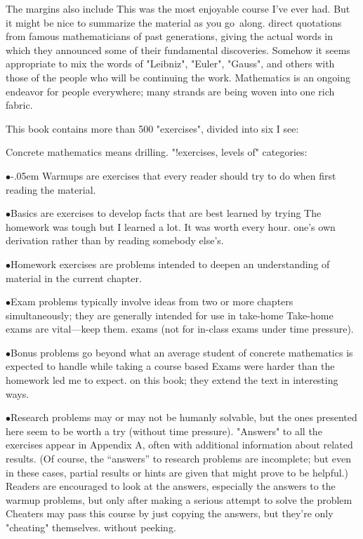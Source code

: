 The margins also include
\g This was the most enjoyable course I've ever had. But it might be nice
to summarize the material as you go~along.\g
direct quotations from famous mathematicians of past generations,
giving the actual words in which they announced some of their
fundamental discoveries. Somehow it seems appropriate to
mix the words of "Leibniz", "Euler", "Gauss", and others with those of
the people who will be continuing the work. Mathematics is an
ongoing endeavor for people everywhere; many strands are being woven
into one rich fabric.

This book contains more than 500 "exercises", divided into six
\g I see:\par Concrete mathematics means drilling.\g
"!exercises, levels of"
categories:

\def\\#1{\smallskip\item{$\bullet$}{\subsubtitle#1\enspace}\ignorespaces}
\\{\kern-.05em Warmups} are exercises that {\sc every reader} should try to
	do when first reading the material.
\\{Basics} are exercises to develop facts that are best learned by trying
\g The homework was tough but I learned a lot. It was worth every hour.\g
	one's own derivation rather than by reading somebody else's.
\\{Homework exercises} are problems intended to deepen an understanding
	of material in the current chapter.
\\{Exam problems} typically involve ideas from two or more chapters
	simultaneously; they are generally intended for use in take-home
\g Take-home exams are vital\dash---keep them.\g
	exams (not for in-class exams under time pressure).
\\{Bonus problems} go beyond what an average student of concrete
	mathematics is expected to handle while taking a course based
\g Exams were harder than the homework led me to expect.\g
	on this book; they extend the text in interesting ways.
\\{Research problems} may or may not be humanly solvable, but the ones
	presented here seem to be worth a try (without time pressure).
\smallskip\noindent
"Answers" to all the exercises appear in Appendix A, often with
additional information about related results. (Of course, the ``answers''
to research problems are incomplete; but even in these cases,
partial results or hints
are given that might prove to be helpful.) Readers are encouraged to
look at the answers, especially the answers to the warmup problems,
but only {\sc after} making a serious attempt to solve the problem
\g Cheaters may pass this course by just copying the answers, but they're
only "cheating" themselves.\g
without peeking.

